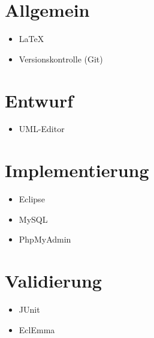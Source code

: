 
\section{Allgemein}
\begin{itemize}
	\item \LaTeX
	\item Versionskontrolle (Git)
\end{itemize}
\section{Entwurf}
\begin{itemize}
	\item UML-Editor
\end{itemize}
\section{Implementierung}
\begin{itemize}
	\item Eclipse
	\item MySQL
	\item PhpMyAdmin
\end{itemize}
\section{Validierung}
\begin{itemize}
	\item JUnit
	\item EclEmma
\end{itemize}

